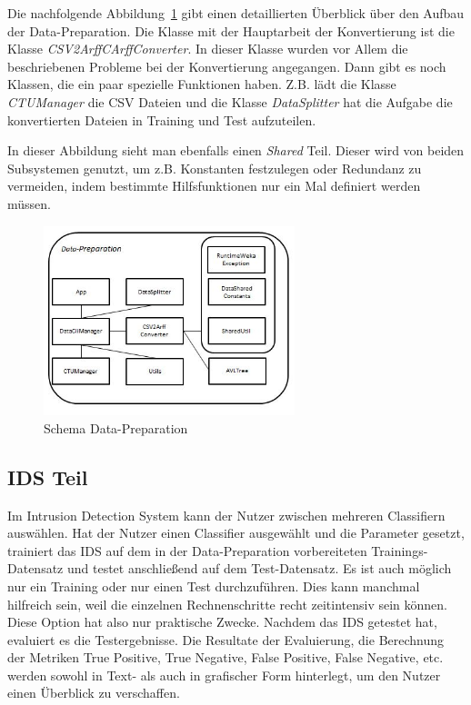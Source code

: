 \documentclass[main.tex]{subfiles}
\begin{document}
Die nachfolgende Abbildung~\ref{fig:schema_data_preparation} gibt einen detaillierten Überblick über den Aufbau der Data-Preparation.
Die Klasse mit der Hauptarbeit der Konvertierung ist die Klasse
\textit{CSV2ArffCArffConverter}.
In dieser Klasse wurden vor Allem die beschriebenen Probleme bei der
Konvertierung angegangen.
Dann gibt es noch Klassen, die ein paar spezielle Funktionen haben. Z.B. lädt
die Klasse \textit{CTUManager} die CSV Dateien und die Klasse
\textit{DataSplitter} hat die Aufgabe die konvertierten Dateien in Training und
Test aufzuteilen.

In dieser Abbildung sieht man ebenfalls einen \textit{Shared} Teil.
Dieser wird von beiden Subsystemen genutzt, um z.B. Konstanten festzulegen oder
Redundanz zu vermeiden, indem bestimmte Hilfsfunktionen nur ein Mal definiert
werden müssen.

\begin{figure}[ht]
 \centering
 \includegraphics[width=0.65\textwidth]{images/Schema_Data_Preparation.jpg}
 \caption{Schema Data-Preparation}
 \label{fig:schema_data_preparation}
\end{figure}


\subsection{IDS Teil} \label{subsec:VorgehenIDS}

Im Intrusion Detection System kann der Nutzer zwischen mehreren Classifiern auswählen.
Hat der Nutzer einen Classifier ausgewählt und die Parameter gesetzt, trainiert das IDS auf dem in der Data-Preparation vorbereiteten Trainings-Datensatz und testet anschließend auf dem Test-Datensatz.
Es ist auch möglich nur ein Training oder nur einen Test durchzuführen.
Dies kann manchmal hilfreich sein, weil die einzelnen Rechnenschritte recht
zeitintensiv sein können.
Diese Option hat also nur praktische Zwecke.
Nachdem das IDS getestet hat, evaluiert es die Testergebnisse.
Die Resultate der Evaluierung, die Berechnung der Metriken True Positive, True
Negative, False Positive, False Negative, etc. werden sowohl in Text- als auch in
grafischer Form hinterlegt, um den Nutzer einen Überblick zu verschaffen.
\end{document}
